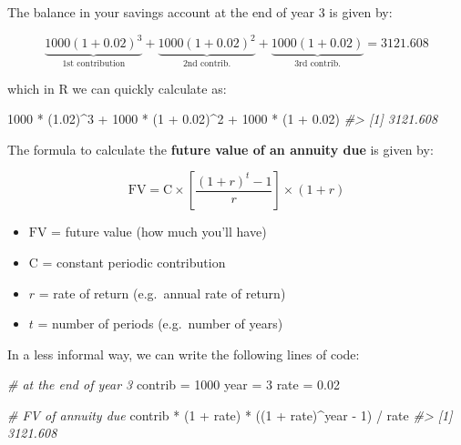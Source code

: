 \documentclass[
]{book}
\newenvironment{Shaded}{\begin{snugshade}}{\end{snugshade}}
\newcommand{\CommentTok}[1]{\textcolor[rgb]{0.56,0.35,0.01}{\textit{#1}}}
\newcommand{\DecValTok}[1]{\textcolor[rgb]{0.00,0.00,0.81}{#1}}
\newcommand{\FloatTok}[1]{\textcolor[rgb]{0.00,0.00,0.81}{#1}}
\newcommand{\NormalTok}[1]{#1}
\newcommand{\OtherTok}[1]{\textcolor[rgb]{0.56,0.35,0.01}{#1}}
\newcommand{\SpecialCharTok}[1]{\textcolor[rgb]{0.00,0.00,0.00}{#1}}
\begin{document}
The balance in your savings account at the end of year 3 is given by:

\[
\underbrace{1000 (1 + 0.02)^3}_{\text{1st contribution}} + \underbrace{1000 (1 + 0.02)^2}_{\text{2nd contrib.}} + \underbrace{1000 (1 + 0.02)}_{\text{3rd contrib.}} = 3121.608
\]

which in R we can quickly calculate as:

\begin{Shaded}
\begin{Highlighting}[]
\DecValTok{1000} \SpecialCharTok{*}\NormalTok{ (}\FloatTok{1.02}\NormalTok{)}\SpecialCharTok{\^{}}\DecValTok{3} \SpecialCharTok{+} \DecValTok{1000} \SpecialCharTok{*}\NormalTok{ (}\DecValTok{1} \SpecialCharTok{+} \FloatTok{0.02}\NormalTok{)}\SpecialCharTok{\^{}}\DecValTok{2} \SpecialCharTok{+} \DecValTok{1000} \SpecialCharTok{*}\NormalTok{ (}\DecValTok{1} \SpecialCharTok{+} \FloatTok{0.02}\NormalTok{)}
\CommentTok{\#\textgreater{} [1] 3121.608}
\end{Highlighting}
\end{Shaded}

The formula to calculate the \textbf{future value of an annuity due} is given by:

\[
\text{FV} = \text{C} \times \left [ \frac{(1 + r)^t - 1}{r} \right] \times (1 + r)
\]

\begin{itemize}
\item
  \(\text{FV}\) = future value (how much you'll have)
\item
  \(\text{C}\) = constant periodic contribution
\item
  \(r\) = rate of return (e.g.~annual rate of return)
\item
  \(t\) = number of periods (e.g.~number of years)
\end{itemize}

In a less informal way, we can write the following lines of code:

\begin{Shaded}
\begin{Highlighting}[]
\CommentTok{\# at the end of year 3}
\NormalTok{contrib }\OtherTok{=} \DecValTok{1000}
\NormalTok{year }\OtherTok{=} \DecValTok{3}
\NormalTok{rate }\OtherTok{=} \FloatTok{0.02}

\CommentTok{\# FV of annuity due}
\NormalTok{contrib }\SpecialCharTok{*}\NormalTok{ (}\DecValTok{1} \SpecialCharTok{+}\NormalTok{ rate) }\SpecialCharTok{*}\NormalTok{ ((}\DecValTok{1} \SpecialCharTok{+}\NormalTok{ rate)}\SpecialCharTok{\^{}}\NormalTok{year }\SpecialCharTok{{-}} \DecValTok{1}\NormalTok{) }\SpecialCharTok{/}\NormalTok{ rate}
\CommentTok{\#\textgreater{} [1] 3121.608}
\end{Highlighting}
\end{Shaded}
\end{document}
